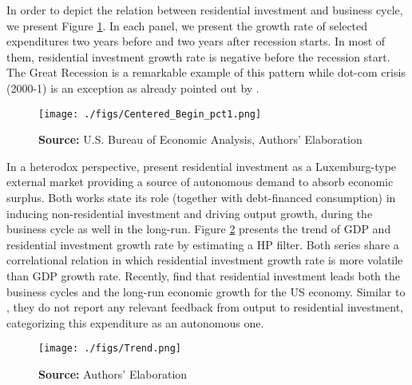 \documentclass[12pt, a4paper]{article}
\begin{document}
In order to depict the relation between residential investment and business cycle, we present Figure \ref{fig:cycle}.
In each panel, we present the growth rate of selected expenditures two years before and two years after recession starts.
In most of them, residential investment growth rate is negative before the recession start.
The Great Recession is a remarkable example of this pattern while dot-com crisis (2000-1) is an exception as already pointed out by \textcite{leamer_housing_2007}.


\begin{figure}[H]
	\centering
	\caption{Selected expecditure growth rates 2 years before and after recession start\\Dashed lines indicates recession start (NBER recession dating procedure)}
	\label{fig:cycle}
	\texttt{[image: ./figs/Centered\_Begin\_pct1.png]}
	\caption*{\textbf{Source:} U.S. Bureau of Economic Analysis, Authors' Elaboration}
\end{figure}


In a heterodox perspective, \textcites{fiebiger_semi-autonomous_2018}{fiebiger_trend_2017} present residential investment as a Luxemburg-type external market providing a source of autonomous demand to absorb economic surplus.
Both works state its role (together with debt-financed consumption) in inducing non-residential investment and driving output growth, during the business cycle as well in the long-run.
Figure \ref{fig:trend} presents the trend of GDP and residential investment growth rate by estimating a HP filter.
Both series share a correlational relation in which residential investment growth rate is more volatile than GDP growth rate.
Recently, \textcite{perez_Montiel_2021} find that residential investment leads both the business cycles and the long-run economic growth for the US economy.
Similar to \textcite{girardi_long-run_2016}, they do not report any relevant feedback from output to residential investment, categorizing this expenditure as an autonomous one.

\begin{figure}[H]
	\centering
	\caption{GDP and Residential investment growth rate tred (HP filter, $\lambda = 1600$)}
	\label{fig:trend}
	\texttt{[image: ./figs/Trend.png]}
	\caption*{\textbf{Source:} Authors' Elaboration}
\end{figure}
\end{document}

